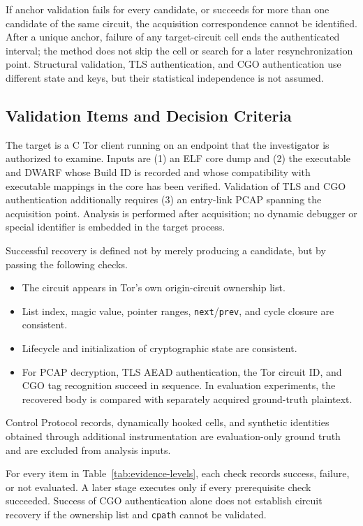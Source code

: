 \documentclass[10pt,a4paper]{article}
\newcommand{\code}[1]{\nolinkurl{#1}}
\begin{document}
If anchor validation fails for every candidate, or succeeds for more than one candidate of the same circuit, the acquisition correspondence cannot be identified. After a unique anchor, failure of any target-circuit cell ends the authenticated interval; the method does not skip the cell or search for a later resynchronization point. Structural validation, TLS authentication, and CGO authentication use different state and keys, but their statistical independence is not assumed.

\subsection{Validation Items and Decision Criteria}

The target is a C Tor client running on an endpoint that the investigator is authorized to examine.
Inputs are (1) an ELF core dump and (2) the executable and DWARF whose Build ID is recorded and whose compatibility with executable mappings in the core has been verified. Validation of TLS and CGO authentication additionally requires (3) an entry-link PCAP spanning the acquisition point.
Analysis is performed after acquisition; no dynamic debugger or special identifier is embedded in the target process.

Successful recovery is defined not by merely producing a candidate, but by passing the following checks.

\begin{itemize}
  \item The circuit appears in Tor's own origin-circuit ownership list.
  \item List index, magic value, pointer ranges, \code{next}/\code{prev}, and cycle closure are consistent.
  \item Lifecycle and initialization of cryptographic state are consistent.
  \item For PCAP decryption, TLS AEAD authentication, the Tor circuit ID, and CGO tag recognition succeed in sequence. In evaluation experiments, the recovered body is compared with separately acquired ground-truth plaintext.
\end{itemize}

Control Protocol records, dynamically hooked cells, and synthetic identities obtained through additional instrumentation are evaluation-only ground truth and are excluded from analysis inputs.

For every item in Table~\ref{tab:evidence-levels}, each check records success, failure, or not evaluated. A later stage executes only if every prerequisite check succeeded. Success of CGO authentication alone does not establish circuit recovery if the ownership list and \code{cpath} cannot be validated.
\end{document}
